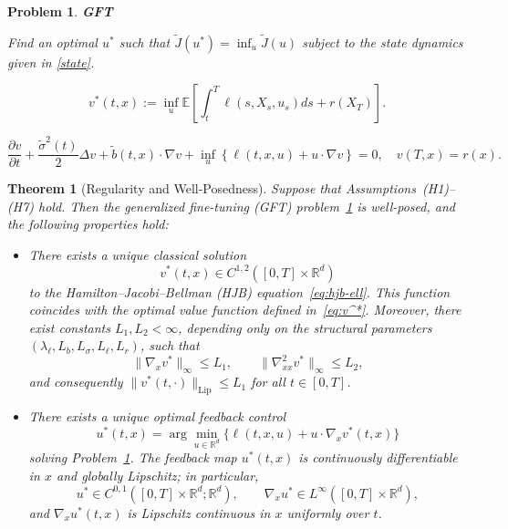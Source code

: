 \documentclass[10pt,a4paper]{amsart}
\newtheorem{problem}{Problem}
\newtheorem{theorem}{Theorem}
\def\w{\widetilde}
\begin{document}
\begin{problem}
\textbf{GFT} 
\label{prob:GFT}

Find an optimal $u^*$ such that 
$\widetilde{J}(u^*) = \inf_{u}\widetilde{J}(u)$ subject to the state dynamics given in \eqref{state}.    
\end{problem}

\begin{equation}
\label{eq:v^*}
v^*(t,x) := \inf_{u} \mathbb{E}\left[ \int_t^T \ell(s, X_s, u_s)ds + r(X_T) \right].
\end{equation}

\begin{equation}
\label{eq:hjb-ell}
    \frac{\partial v}{\partial t} + \frac{\w{\sigma}^2(t)}{2} \Delta v +\w{b} (t,x) \cdot \nabla v + \inf_{u } \left\{ \ell(t,x,u) + u \cdot \nabla v \right\} = 0, \quad v(T,x) = r(x).
\end{equation}

\begin{theorem}[Regularity and Well-Posedness]
\label{theo:Regularity}
Suppose that Assumptions~\textnormal{(H1)--(H7)} hold.  
Then the generalized fine-tuning (GFT) problem~\ref{prob:GFT} is well-posed, and the following properties hold:

\begin{itemize}
\item[\textbf{(i)}]  
There exists a unique classical solution 
\[
v^*(t,x) \in C^{1,2}([0,T]\times\mathbb{R}^d)
\]
to the Hamilton--Jacobi--Bellman (HJB) equation~\eqref{eq:hjb-ell}.  
This function coincides with the optimal value function defined in~\eqref{eq:v^*}.  
Moreover, there exist constants $L_1,L_2<\infty$, depending only on the structural parameters $(\lambda_\ell,L_b,L_\sigma,L_\ell,L_r)$, such that
\[
\|\nabla_x v^*\|_\infty \le L_1, 
\qquad 
\|\nabla_{xx}^2 v^*\|_\infty \le L_2,
\]
and consequently $\|v^*(t,\cdot)\|_{\mathrm{Lip}}\le L_1$ for all $t\in[0,T]$.

\item[\textbf{(ii)}] 
There exists a unique optimal feedback control 
\[
u^*(t,x) = \arg\min_{u\in\mathbb{R}^d}\{\ell(t,x,u)+u\cdot\nabla_x v^*(t,x)\}
\]
solving Problem~\ref{prob:GFT}.  
The feedback map $u^*(t,x)$ is continuously differentiable in $x$ and globally Lipschitz; in particular,
\[
u^* \in C^{0,1}([0,T]\times\mathbb{R}^d;\mathbb{R}^d),
\qquad 
\nabla_x u^* \in L^\infty([0,T]\times\mathbb{R}^d),
\]
and $\nabla_x u^*(t,x)$ is Lipschitz continuous in $x$ uniformly over $t$.
\end{itemize}
\end{theorem}
\end{document}
